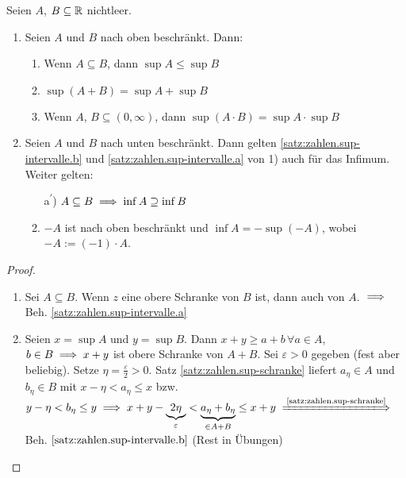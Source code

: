 \documentclass[12pt]{scrreprt}
\begin{document}
\begin{satz}\label{satz:zahlen.sup-intervalle}
Seien $A$, $B \subseteq \mathbb{R}$ nichtleer.
\begin{enumerate}
\item Seien $A$ und $B$ nach oben beschränkt. Dann:
	\begin{enumerate}
	\item \label{satz:zahlen.sup-intervalle.a}
		Wenn $A \subseteq B$, dann $\sup A \le \sup B$
	\item \label{satz:zahlen.sup-intervalle.b}
		$\sup (A+B) = \sup A + \sup B$
	\item \label{satz:zahlen.sup-intervalle.c}
		Wenn $A$, $B \subseteq (0, \infty)$, dann $\sup(A\cdot B) = \sup A \cdot \sup B$
	\end{enumerate}
\item Seien $A$ und $B$ nach unten beschränkt. Dann gelten
	\ref{satz:zahlen.sup-intervalle.b} und \ref{satz:zahlen.sup-intervalle.a} von 1) auch für das Infimum. Weiter gelten:
	\begin{enumerate} %
	\item[a\textsuperscript{$\prime$})] \label{satz:zahlen.sup-intervalle.a2}
	$A \subseteq B \implies \inf A \supseteq \inf B$
	\setcounter{enumii}{3}
	\item \label{satz:zahlen.sup-intervalle.d}
	$-A$ ist nach oben beschränkt und $\inf A = -\sup(-A)$, wobei $-A:=(-1)\cdot A$.
	\end{enumerate}
\end{enumerate}
\end{satz}
\begin{proof}
\begin{enumerate}
\item Sei $A\subseteq B$. Wenn $z$ eine obere Schranke von $B$ ist, dann auch von $A$. $\implies$ Beh. \ref{satz:zahlen.sup-intervalle.a}
\item Seien $x=\sup A$ und $y = \sup B$. Dann $x+y\ge a+b\,\forall a \in A$, $b\in B \implies x+y $ ist obere Schranke von $A+B$. Sei $\varepsilon >0$
gegeben (fest aber beliebig). Setze  $\eta = \frac{\varepsilon}{2} > 0$. Satz \ref{satz:zahlen.sup-schranke} liefert $a_\eta \in A$ und 
$b_\eta \in B$ mit $x-\eta < a_\eta \le x$ bzw. $y-\eta < b_\eta \le y
\folgt x+y-\underbrace{2\eta}_\varepsilon < \underbrace{a_\eta + b_\eta}_{\in A+B} \le x+y \folgtnach{\ref{satz:zahlen.sup-schranke}}$ Beh. $\ref{satz:zahlen.sup-intervalle.b}$
(Rest in Übungen)
\end{enumerate}
\end{proof}
\end{document}
